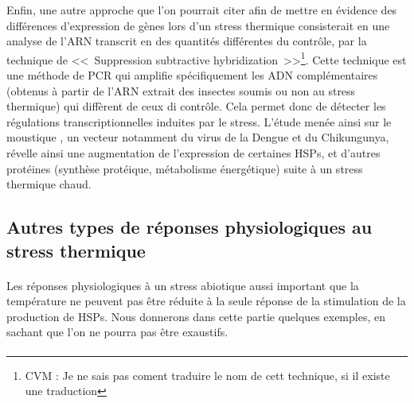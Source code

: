 
		Enfin, une autre approche que l'on pourrait citer afin de mettre en évidence des différences d'expression de gènes lors d'un stress thermique consisterait en une analyse de l'ARN transcrit en des quantités différentes du contrôle, par la technique de <<~Suppression subtractive hybridization~>>\footnote{CVM : Je ne sais pas coment traduire le nom de cett technique, si il existe une traduction}.
		Cette technique est une méthode de PCR qui amplifie spécifiquement les ADN complémentaires (obtenus à partir de l'ARN extrait des insectes soumis ou non au stress thermique) qui diffèrent de ceux di contrôle.
		Cela permet donc de détecter les régulations transcriptionnelles induites par le stress.
		L'étude menée ainsi sur le moustique , un vecteur notamment du virus de la Dengue et du Chikungunya, révelle ainsi une augmentation de l'expression de certaines HSPs, et d'autres protéines (synthèse protéique, métabolisme énergétique) suite à un stress thermique chaud.


		\subsection{Autres types de réponses physiologiques au stress thermique} %

		\paragraph{}
		Les réponses physiologiques à un stress abiotique aussi important que la température ne peuvent pas être réduite à la seule réponse de la stimulation de la production de HSPs.
		Nous donnerons dans cette partie quelques exemples, en sachant que l'on ne pourra pas être exaustifs.

		\paragraph{}

